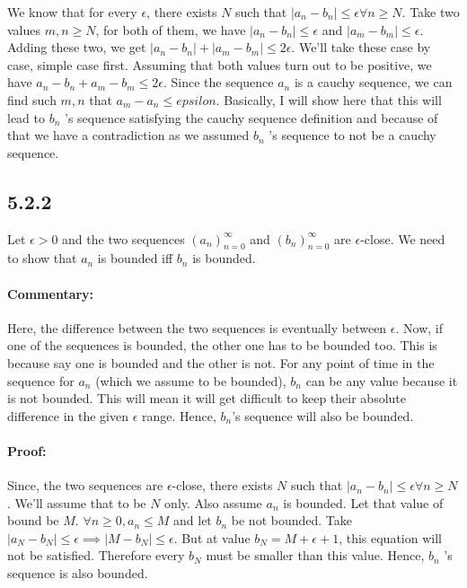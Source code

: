 \documentclass{report}
\begin{document}
We know that for every $\epsilon$, there exists  $N$ such that $|a_n-b_n| \le \epsilon \forall n \ge N$.  Take two values $m,n \ge N$, for both of them, we have  $|a_n - b_n| \le \epsilon$ and  $|a_m - b_m| \le \epsilon$. Adding these two, we get $|a_n-b_n| + |a_m - b_m| \le 2\epsilon$. We'll take these case by case, simple case first. Assuming that both values turn out to be positive, we have  $a_n-b_n+a_m-b_m \le 2\epsilon$. Since the sequence  $a_n$ is a cauchy sequence, we can find such  $m,n$ that $a_m-a_n \le epsilon$. Basically, I will show here that this will lead to $b_n$ 's sequence satisfying the cauchy sequence definition and because of that we have a contradiction as we assumed $b_n$ 's sequence to not be a cauchy sequence.    



\subsection*{5.2.2} Let $\epsilon > 0$ and the two sequences  $\left( a_n \right)_{n=0}^\infty$ and $\left( b_n \right) _{n=0}^\infty$ are $\epsilon$-close. We need to show that $a_n$ is bounded iff $b_n$ is bounded.
\paragraph{Commentary: } Here, the difference between the two sequences is eventually between $\epsilon$. Now, if one of the sequences is  bounded, the other one has to be bounded too. This is because say one is bounded and the other is not. For any point of time in the sequence for $a_n$ (which we assume to be bounded), $b_n$ can be any value because it is not bounded. This will mean it will get difficult to keep their absolute difference in the given $\epsilon$ range. Hence,  $b_n$'s sequence will also be bounded.  
\paragraph{Proof: } Since, the two sequences are $\epsilon$-close, there exists $N$ such that  $|a_n - b_n| \le \epsilon \forall n \ge N$. We'll assume that to be  $N$ only. Also assume $a_n$ is bounded. Let that value of bound be $M$. $\forall n \ge 0, a_n \le M$ and let $b_n$ be not bounded. Take $|a_N-b_N| \le \epsilon \implies |M-b_N| \le \epsilon$. But at value $b_N = M + \epsilon + 1$, this equation will not be satisfied. Therefore  every  $b_N$ must be smaller than this value. Hence,  $b_n$ 's sequence is also bounded.
\end{document}

